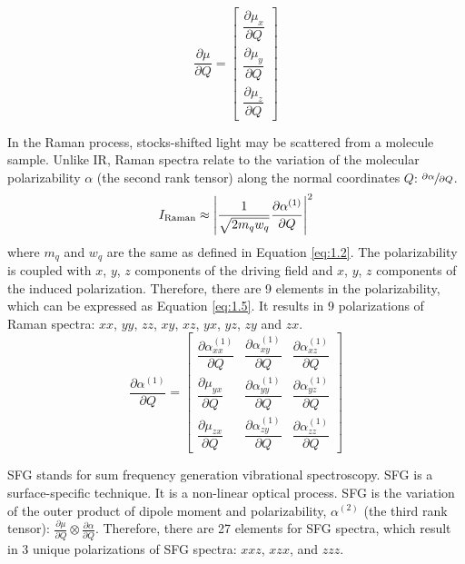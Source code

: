 \begin{equation} \label{eq:1.3}
\frac{\partial\mu}{\partial Q} = \begin{bmatrix}
									\dfrac{\partial\mu_{x}}{\partial Q} \\
									\dfrac{\partial\mu_{y}}{\partial Q} \\
									\dfrac{\partial\mu_{z}}{\partial Q}
								  \end{bmatrix}
\end{equation}

In the Raman process, stocks-shifted light may be scattered from a molecule sample. Unlike IR, Raman spectra relate to the variation of the molecular polarizability $\alpha$ (the second rank tensor) along the normal coordinates $Q$: $\sfrac{\partial\alpha}{\partial Q}$. \\ 

\begin{equation} \label{eq:1.4}
I_{\rm Raman} \approx \left| \frac{1}{\sqrt{2m_{q}w_{q}}} \frac{\partial\alpha^{(1)}}{\partial Q} \right|^{2}
\end{equation}
where $m_{q}$ and $w_{q}$ are the same as defined in Equation \ref{eq:1.2}. The polarizability is coupled with $x$, $y$, $z$ components of the driving field and $x$, $y$, $z$ components of the induced polarization. Therefore, there are 9 elements in the polarizability, which can be expressed as Equation \ref{eq:1.5}. It results in 9 polarizations of Raman spectra: $xx$, $yy$, $zz$, $xy$, $xz$, $yx$, $yz$, $zy$ and $zx$. \\

\begin{equation} \label{eq:1.5}
\frac{\partial\alpha^{(1)}}{\partial Q} = \begin{bmatrix}
\dfrac{\partial\alpha_{xx}^{(1)}}{\partial Q} & \dfrac{\partial\alpha_{xy}^{(1)}}{\partial Q} & \dfrac{\partial\alpha_{xz}^{(1)}}{\partial Q} \\
\dfrac{\partial\mu_{yx}}{\partial Q} & \dfrac{\partial\alpha_{yy}^{(1)}}{\partial Q} & \dfrac{\partial\alpha_{yz}^{(1)}}{\partial Q}\\
\dfrac{\partial\mu_{zx}}{\partial Q} & \dfrac{\partial\alpha_{zy}^{(1)}}{\partial Q} & \dfrac{\partial\alpha_{zz}^{(1)}}{\partial Q}
\end{bmatrix}
\end{equation}

SFG stands for sum frequency generation vibrational spectroscopy. SFG is a surface-specific technique. It is a non-linear optical process. SFG is the variation of the outer product of dipole moment and polarizability, $\alpha^{(2)}$ (the third rank tensor): $\frac{\partial\mu}{\partial Q} \otimes \frac{\partial\alpha}{\partial Q} $. Therefore, there are 27 elements for SFG spectra, which result in 3 unique polarizations of SFG spectra: $xxz$, $xzx$, and $zzz$. \\

